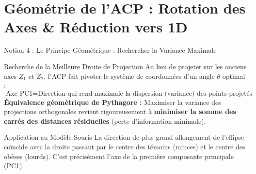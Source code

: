 \documentclass[aspectratio=169,10pt]{beamer}
\begin{document}
\section{Géométrie de l'ACP : Rotation des Axes \& Réduction vers 1D}

\begin{frame}{Notion 4 : Le Principe Géométrique : Rechercher la Variance Maximale}
  \begin{conceptbox}{Recherche de la Meilleure Droite de Projection}
    \footnotesize
    Au lieu de projeter sur les anciens axes $Z_1$ et $Z_2$, l'ACP fait pivoter le système de coordonnées d'un angle $\theta$ optimal :
    \begin{equation*}
      \text{Axe PC1} = \text{Direction qui rend maximale la dispersion (variance) des points projetés}
    \end{equation*}
    \textbf{Équivalence géométrique de Pythagore :}
    Maximiser la variance des projections orthogonales revient rigoureusement à \textbf{minimiser la somme des carrés des distances résiduelles} (perte d'information minimale).
  \end{conceptbox}
  \vspace{1mm}
  \begin{biobox}{Application au Modèle Souris}
    \footnotesize
    La direction de plus grand allongement de l'ellipse coïncide avec la droite passant par le centre des témoins (minces) et le centre des obèses (lourds). C'est précisément l'axe de la première composante principale (PC1).
  \end{biobox}
\end{frame}
\end{document}
